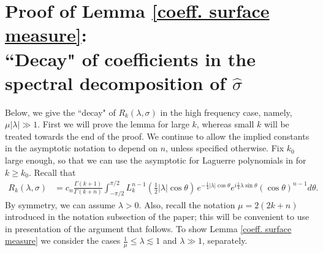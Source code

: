 \documentclass[11pt, reqno]{amsart}
\theoremstyle{plain}
\theoremstyle{remark}
\theoremstyle{example}
\theoremstyle{definition}
\numberwithin{equation}{section}
\begin{document}
 \section{Proof of Lemma \ref{coeff. surface measure}: \\ ``Decay" of  coefficients in the spectral decomposition of $\widehat{\sigma}$  }\label{mainnovelproof}
Below, we give the ``decay" of $R_{k}(\lambda, \sigma)$ in the high frequency case, namely,  $\mu |\lambda| \gg 1$. First we will prove the lemma for large $k$, whereas small $k$ will be treated towards the end of the proof. We continue to allow the implied constants in the asymptotic notation to depend on $n$, unless specified otherwise. Fix $k_{0}$ large enough, so that we can use the asymptotic for Laguerre polynomials in  for $k \geq k_{0}$.  Recall that 
\begin{equation}\label{Coeff. Rk as Laguerre integral}
   \begin{split}
        R_{k}(\lambda, \sigma) 
        & = c_{n} \frac{\Gamma(k+1)}{\Gamma(k+n)} \int_{- \pi/2}^{\pi/2} L_{k}^{n-1} \left( {\textstyle\frac{1}{2} } |\lambda|  \cos{\theta}  \right) \, e^{-\frac{1}{4} |\lambda| \cos{\theta}}  e^{i \frac{1}{4} \lambda \sin{\theta}} (\cos{\theta})^{n-1} d \theta.
   \end{split}
\end{equation}   
By symmetry, we can assume $\lambda>0$. Also, recall the notation $\mu = 2(2k +n)$ introduced in the notation subsection of the paper; this will be convenient to use in presentation of the argument that follows. To show Lemma \ref{coeff. surface measure} we consider the cases $ \frac{1}{\mu} \leq \lambda \lesssim 1$ and $\lambda \gg 1$, separately.
\end{document}
